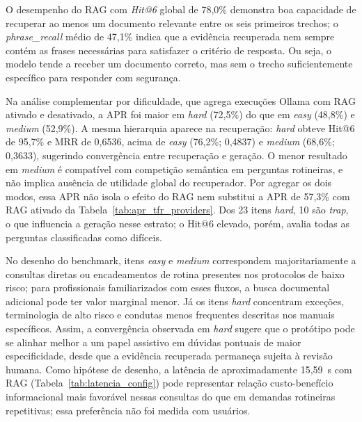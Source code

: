 \documentclass[12pt]{article}
\begin{document}
O desempenho do RAG com \textit{Hit@6} global de 78,0\% demonstra boa capacidade de recuperar ao menos um documento relevante entre os seis primeiros trechos; o \textit{phrase\_recall} médio de 47,1\% indica que a evidência recuperada nem sempre contém as frases necessárias para satisfazer o critério de resposta.
Ou seja, o modelo tende a receber um documento correto, mas sem o trecho suficientemente específico para responder com segurança.

Na análise complementar por dificuldade, que agrega execuções Ollama com RAG ativado e desativado, a APR foi maior em \textit{hard} (72,5\%) do que em \textit{easy} (48,8\%) e \textit{medium} (52,9\%). A mesma hierarquia aparece na recuperação: \textit{hard} obteve Hit@6 de 95,7\% e MRR de 0,6536, acima de \textit{easy} (76,2\%; 0,4837) e \textit{medium} (68,6\%; 0,3633), sugerindo convergência entre recuperação e geração. O menor resultado em \textit{medium} é compatível com competição semântica em perguntas rotineiras, e não implica ausência de utilidade global do recuperador. Por agregar os dois modos, essa APR não isola o efeito do RAG nem substitui a APR de 57,3\% com RAG ativado da Tabela~\ref{tab:apr_tfr_providers}. Dos 23 itens \textit{hard}, 10 são \textit{trap}, o que influencia a geração nesse estrato; o Hit@6 elevado, porém, avalia todas as perguntas classificadas como difíceis.

No desenho do benchmark, itens \textit{easy} e \textit{medium} correspondem majoritariamente a consultas diretas ou encadeamentos de rotina presentes nos protocolos de baixo risco; para profissionais familiarizados com esses fluxos, a busca documental adicional pode ter valor marginal menor. Já os itens \textit{hard} concentram exceções, terminologia de alto risco e condutas menos frequentes descritas nos manuais específicos. \cite{ManualAltoRisco2022} Assim, a convergência observada em \textit{hard} sugere que o protótipo pode se alinhar melhor a um papel assistivo em dúvidas pontuais de maior especificidade, desde que a evidência recuperada permaneça sujeita à revisão humana. Como hipótese de desenho, a latência de aproximadamente 15,59~s com RAG (Tabela~\ref{tab:latencia_config}) pode representar relação custo-benefício informacional mais favorável nessas consultas do que em demandas rotineiras repetitivas; essa preferência não foi medida com usuários.
\end{document}
